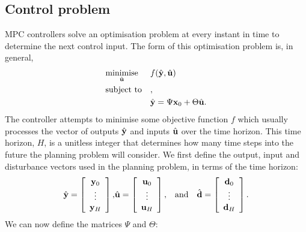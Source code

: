 \subsection{Control problem}

MPC controllers solve an optimisation problem at every instant in time to determine the next control input.
The form of this optimisation problem is, in general,
\begin{equation}
	\label{eq:mpc-opt}
	\optimise
		{minimise}{\hvec{u}}
		{f(\hvec{y}, \hvec{u})}
		{\hvec{y} = \Psi \vec{x}_0 + \Theta \hvec{u}}
\end{equation}
The controller attempts to minimise some objective function $f$ which usually processes the vector of outputs $\hat{\mathbf{y}}$ and inputs $\hat{\mathbf{u}}$ over the time horizon.
This time horizon, $H$, is a unitless integer that determines how many time steps into the future the planning problem will consider.
We first define the output, input and disturbance vectors used in the planning problem, in terms of the time horizon:
\begin{eqnarray}
	\label{eq:mpc-vectors}
	\hat{\mathbf{y}} = \left[\begin{array}{c}
		\mathbf{y}_0 \\
		\vdots \\
		\mathbf{y}_H
	\end{array}\right],
	&
	\hat{\mathbf{u}} = \left[\begin{array}{c}
		\mathbf{u}_0 \\
		\vdots \\
		\mathbf{u}_H
	\end{array}\right],
	& \text{and} \quad
	\hat{\mathbf{d}} = \left[\begin{array}{c}
		\mathbf{d}_0 \\
		\vdots \\
		\mathbf{d}_H
	\end{array}\right].
\end{eqnarray}
We can now define the matrices $\Psi$ and $\Theta$:
